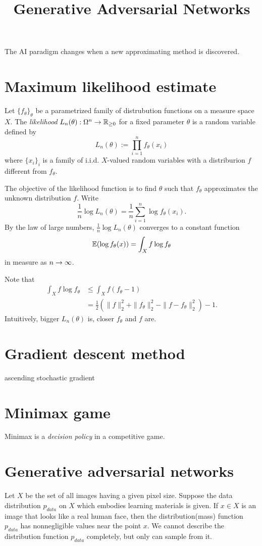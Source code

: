 \documentclass{../exp}
\title{Generative Adversarial Networks}
\begin{document}
\maketitle

The AI paradigm changes when a new approximating method is discovered.

\section{Maximum likelihood estimate}
\begin{defn}
Let $\{f_\theta\}_\theta$ be a parametrized family of distrubution functions on a measure space $X$.
The \emph{likelihood} $L_n(\theta):\Omega^n\to\R_{\ge0}$ for a fixed parameter $\theta$ is a random variable defined by
\[L_n(\theta):=\prod_{i=1}^nf_\theta(x_i)\]
where $\{x_i\}_i$ is a family of i.i.d. $X$-valued random variables with a distriburion $f$ different from $f_\theta$.
\end{defn}
The objective of the likelihood function is to find $\theta$ such that $f_\theta$ approximates the unknown distribution $f$.
Write
\[\frac1n\log L_n(\theta)=\frac1n\sum_{i=1}^n\log f_\theta(x_i).\]
By the law of large numbers, $\frac1n\log L_n(\theta)$ converges to a constant function
\[\mathbb{E}(\log f_\theta(x))=\int_Xf\log f_\theta\]
in measure as $n\to\oo$.

Note that
\begin{align*}
\int_Xf\log f_\theta&\le\int_Xf(f_\theta-1)\\
&=\frac12(\|f\|_2^2+\|f_\theta\|_2^2-\|f-f_\theta\|_2^2)-1.
\end{align*}
Intuitively, bigger $L_n(\theta)$ is, closer $f_\theta$ and $f$ are.


\section{Gradient descent method}
ascending stochastic gradient


\section{Minimax game}

Minimax is a \emph{decision policy} in a competitive game.

\section{Generative adversarial networks}
Let $X$ be the set of all images having a given pixel size.
Suppose the data distribution $p_{data}$ on $X$ which embodies learning materials is given.
If $x\in X$ is an image that looks like a real human face, then the distribution(mass) function $p_{data}$ has nonnegligible values near the point $x$.
We cannot describe the distribution function $p_{data}$ completely, but only can sample from it.
\end{document}

